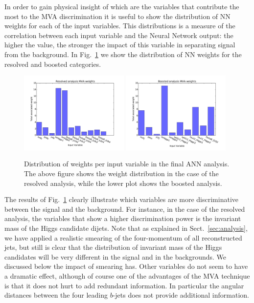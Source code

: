 In order to gain physical insight of which are the variables that
contribute the most to the MVA discrimination it is useful
to show the distribution of NN weights for each of the
input variables.
%
This distributions is a measure of the correlation between
each input variable and the Neural Network output: the higher
the value, the stronger the impact of this variable in
separating signal from the background.
%
In Fig.~\ref{fig:nnweights} we show
the distribution of NN weights for the resolved and boosted categories.

\begin{figure}[t]
\begin{center}
\includegraphics[width=0.48\textwidth]{plots/nnweights_res.pdf}
\includegraphics[width=0.48\textwidth]{plots/nnweights_boost.pdf}
\caption{\small Distribution of weights per input variable in the final ANN analysis. The above figure shows the weight distribution in the case of the resolved analysis, while the lower plot shows the boosted analysis.}
\label{fig:nnweights}
\end{center}
\end{figure}

The results of Fig.~\ref{fig:nnweights} clearly illustrate which variables
are more discriminative between the signal and the background.
%
For instance, in the case of the resolved analysis, the variables that show
a higher discrimination power is the invariant mass of the Higgs candidate dijets.
%
Note that as explained in Sect.~\ref{sec:analysis}, we have applied a realistic
smearing of the four-momentum of all reconstructed jets, but still is clear that the
distribution of invariant mass of the Higgs candidates will be very different
in the signal and in the backgrounds.
%
We discussed below the impact of smearing has.
%
Other variables do not seem to have a dramatic effect, although of course one of the
advantages of the MVA technique is that it does not hurt to add redundant
information.
%
In particular the angular distances between the four leading $b$-jets does not
provide additional information.


